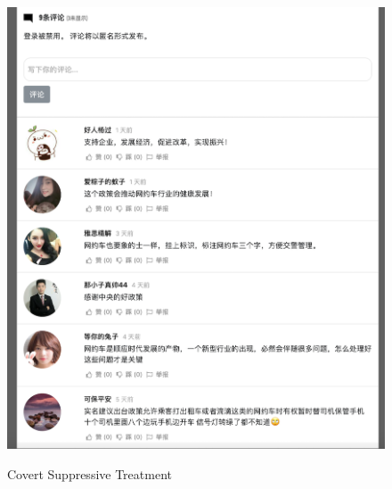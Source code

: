 \documentclass[11pt]{article}
\begin{document}
\begin{figure}
  \centering
  \caption{Covert Suppressive Treatment}
  \vspace{1em}
  \includegraphics[width=\textwidth]{figures/covert_subtractive.png}
  \label{CSP}
\end{figure}
\end{document}
